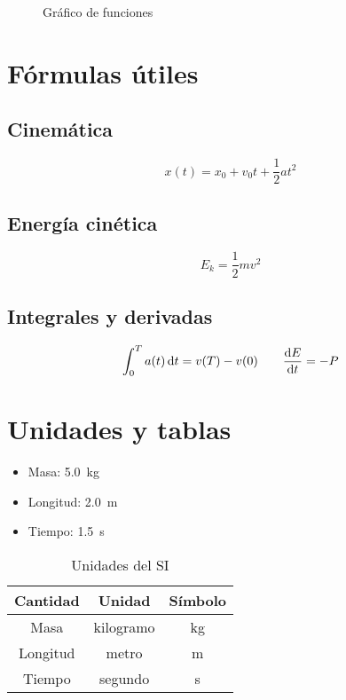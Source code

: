 \documentclass{article}
\numberwithin{equation}{section}
\begin{document}
\begin{figure}[H]
    \centering
    \caption{Gráfico de funciones}
\end{figure}

\section{Fórmulas útiles}

\subsection{Cinemática}
\[
x(t) = x_0 + v_0 t + \frac{1}{2} a t^2
\]

\subsection{Energía cinética}
\[
E_k = \frac{1}{2} m v^2
\]

\subsection{Integrales y derivadas}
\[
\int_0^T a(t) \dd{t} = v(T) - v(0)
\qquad
\dv{E}{t} = -P
\]

\section{Unidades y tablas}

\begin{itemize}
    \item Masa: \SI{5.0}{\kilo\gram}
    \item Longitud: \SI{2.0}{\metre}
    \item Tiempo: \SI{1.5}{\second}
\end{itemize}

\begin{table}[H]
    \centering
    \begin{tabular}{|c|c|c|}
        \hline
        Cantidad & Unidad & Símbolo \\
        \hline
        Masa & kilogramo & \si{\kilogram} \\
        Longitud & metro & \si{\metre} \\
        Tiempo & segundo & \si{\second} \\
        \hline
    \end{tabular}
    \caption{Unidades del SI}
\end{table}
\end{document}
